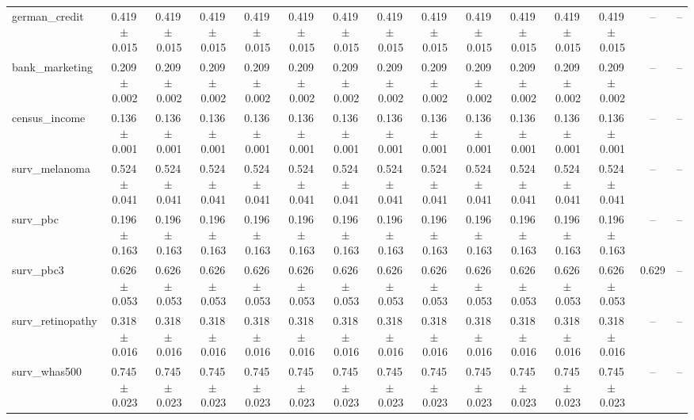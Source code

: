 \documentclass[8pt]{extarticle}
\begin{document}
\begin{longtable}{l*{14}{c}}
german\_credit & 0.419\,$\pm$\,0.015 & 0.419\,$\pm$\,0.015 & 0.419\,$\pm$\,0.015 & 0.419\,$\pm$\,0.015 & 0.419\,$\pm$\,0.015 & 0.419\,$\pm$\,0.015 & 0.419\,$\pm$\,0.015 & 0.419\,$\pm$\,0.015 & 0.419\,$\pm$\,0.015 & 0.419\,$\pm$\,0.015 & 0.419\,$\pm$\,0.015 & 0.419\,$\pm$\,0.015 & -- & -- \\
bank\_marketing & 0.209\,$\pm$\,0.002 & 0.209\,$\pm$\,0.002 & 0.209\,$\pm$\,0.002 & 0.209\,$\pm$\,0.002 & 0.209\,$\pm$\,0.002 & 0.209\,$\pm$\,0.002 & 0.209\,$\pm$\,0.002 & 0.209\,$\pm$\,0.002 & 0.209\,$\pm$\,0.002 & 0.209\,$\pm$\,0.002 & 0.209\,$\pm$\,0.002 & 0.209\,$\pm$\,0.002 & -- & -- \\
census\_income & 0.136\,$\pm$\,0.001 & 0.136\,$\pm$\,0.001 & 0.136\,$\pm$\,0.001 & 0.136\,$\pm$\,0.001 & 0.136\,$\pm$\,0.001 & 0.136\,$\pm$\,0.001 & 0.136\,$\pm$\,0.001 & 0.136\,$\pm$\,0.001 & 0.136\,$\pm$\,0.001 & 0.136\,$\pm$\,0.001 & 0.136\,$\pm$\,0.001 & 0.136\,$\pm$\,0.001 & -- & -- \\
surv\_melanoma & 0.524\,$\pm$\,0.041 & 0.524\,$\pm$\,0.041 & 0.524\,$\pm$\,0.041 & 0.524\,$\pm$\,0.041 & 0.524\,$\pm$\,0.041 & 0.524\,$\pm$\,0.041 & 0.524\,$\pm$\,0.041 & 0.524\,$\pm$\,0.041 & 0.524\,$\pm$\,0.041 & 0.524\,$\pm$\,0.041 & 0.524\,$\pm$\,0.041 & 0.524\,$\pm$\,0.041 & -- & -- \\
surv\_pbc & 0.196\,$\pm$\,0.163 & 0.196\,$\pm$\,0.163 & 0.196\,$\pm$\,0.163 & 0.196\,$\pm$\,0.163 & 0.196\,$\pm$\,0.163 & 0.196\,$\pm$\,0.163 & 0.196\,$\pm$\,0.163 & 0.196\,$\pm$\,0.163 & 0.196\,$\pm$\,0.163 & 0.196\,$\pm$\,0.163 & 0.196\,$\pm$\,0.163 & 0.196\,$\pm$\,0.163 & -- & -- \\
surv\_pbc3 & 0.626\,$\pm$\,0.053 & 0.626\,$\pm$\,0.053 & 0.626\,$\pm$\,0.053 & 0.626\,$\pm$\,0.053 & 0.626\,$\pm$\,0.053 & 0.626\,$\pm$\,0.053 & 0.626\,$\pm$\,0.053 & 0.626\,$\pm$\,0.053 & 0.626\,$\pm$\,0.053 & 0.626\,$\pm$\,0.053 & 0.626\,$\pm$\,0.053 & 0.626\,$\pm$\,0.053 & 0.629 & -- \\
surv\_retinopathy & 0.318\,$\pm$\,0.016 & 0.318\,$\pm$\,0.016 & 0.318\,$\pm$\,0.016 & 0.318\,$\pm$\,0.016 & 0.318\,$\pm$\,0.016 & 0.318\,$\pm$\,0.016 & 0.318\,$\pm$\,0.016 & 0.318\,$\pm$\,0.016 & 0.318\,$\pm$\,0.016 & 0.318\,$\pm$\,0.016 & 0.318\,$\pm$\,0.016 & 0.318\,$\pm$\,0.016 & -- & -- \\
surv\_whas500 & 0.745\,$\pm$\,0.023 & 0.745\,$\pm$\,0.023 & 0.745\,$\pm$\,0.023 & 0.745\,$\pm$\,0.023 & 0.745\,$\pm$\,0.023 & 0.745\,$\pm$\,0.023 & 0.745\,$\pm$\,0.023 & 0.745\,$\pm$\,0.023 & 0.745\,$\pm$\,0.023 & 0.745\,$\pm$\,0.023 & 0.745\,$\pm$\,0.023 & 0.745\,$\pm$\,0.023 & -- & -- \\

\end{longtable}
\end{document}
